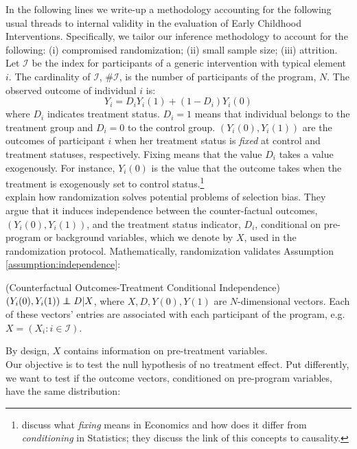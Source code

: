 \noindent In the following lines we write-up a methodology accounting for the following usual threads to internal validity in the evaluation of Early Childhood Interventions. Specifically, we tailor our inference methodology to account for the following: (i) compromised randomization; (ii) small sample size; (iii) attrition.\\ 
\indent Let $\mathcal{I}$ be the index for participants of a generic intervention with typical element $i$. The cardinality of $\mathcal{I}$, $\#\mathcal{I}$, is the number of participants of the program, $N$. The observed outcome of individual $i$ is:
\begin{equation}
Y_{i} = D_{i}Y_{i}(1) + (1 - D_{i}) Y_{i}(0)
\end{equation}
where $D_{i}$ indicates treatment status. $D_{i} = 1$ means that individual belongs to the treatment group and $D_{i} = 0$ to the control group. $(Y_{i}(0), Y_{i}(1))$ are the outcomes of participant $i$ when her treatment status is \emph{fixed} at control and treatment statuses, respectively. Fixing means that the value $D_{i}$ takes a value exogenously. For instance, $Y_{i}(0)$ is the value that the outcome takes when the treatment is exogenously set to control status.\footnote{\citet{heckman2013causal} discuss what \emph{fixing} means in Economics and how does it differ from \emph{conditioning} in Statistics; they discuss the link of this concepts to causality.}\\
\indent \citet{heckman2010analyzing} explain how randomization solves potential problems of selection bias. They argue that it induces independence between the counter-factual outcomes, $(Y_{i}(0), Y_{i}(1))$, and the treatment status indicator, $D_{i}$, conditional on pre-program or background variables, which we denote by $X$, used in the randomization protocol. Mathematically, randomization validates Assumption \ref{assumption:independence}:

\begin{assumption} 
\label{assumption:independence}
(Counterfactual Outcomes-Treatment Conditional Independence) 
$(Y_{i}(0), Y_{i}(1)) \independent D|X$, where $X,D,Y(0),Y(1)$ are $N$-dimensional vectors. Each of these vectors' entries are associated with each participant of the program, e.g. 
$X = (X_{i}:i \in \mathcal{I})$.
\end{assumption}

\noindent By design, $X$ contains information on pre-treatment variables.\\
\indent Our objective is to test the null hypothesis of no treatment effect. Put differently, we want to test if the outcome vectors, conditioned on pre-program variables, have the same distribution:

